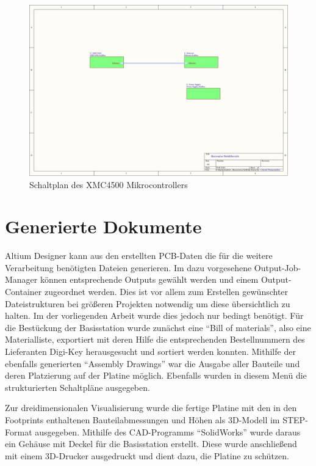 \begin{figure}[h]
	\centering
	\includegraphics[width=\linewidth,page=5]{"../../Altium/mobile Basisstation/Project Outputs for mobile Basisstation/Basisstation Schematics"}
	\caption{Schaltplan des XMC4500 Mikrocontrollers}
	\label{fig:schemXMC}
\end{figure}




\section{Generierte Dokumente}
Altium Designer kann aus den erstellten \ac{PCB}-Daten die für die weitere Verarbeitung benötigten Dateien generieren. Im dazu vorgesehene Output-Job-Manager können entsprechende Outputs gewählt werden und einem Output-Container zugeordnet werden. Dies ist vor allem zum Erstellen gewünschter Dateistrukturen bei größeren Projekten notwendig um diese übersichtlich zu halten. Im der vorliegenden Arbeit wurde dies jedoch nur bedingt benötigt.
Für die Bestückung der Basisstation wurde zunächst eine \enquote{Bill of materials}, also eine Materialliste, exportiert mit deren Hilfe die entsprechenden Bestellnummern des Lieferanten Digi-Key herausgesucht und sortiert werden konnten. Mithilfe der ebenfalls generierten \enquote{Assembly Drawings} war die Ausgabe aller Bauteile und deren Platzierung auf der Platine möglich. Ebenfalls wurden in diesem Menü die strukturierten Schaltpläne ausgegeben.

Zur dreidimensionalen Visualisierung wurde die fertige Platine mit den in den Footprints enthaltenen Bauteilabmessungen und Höhen als 3D-Modell im \ac{STEP}-Format ausgegeben. Mithilfe des \ac{CAD}-Programms \enquote{SolidWorks} wurde daraus ein Gehäuse mit Deckel für die Basisstation erstellt. Diese wurde anschließend mit einem 3D-Drucker ausgedruckt und dient dazu, die Platine zu schützen.

